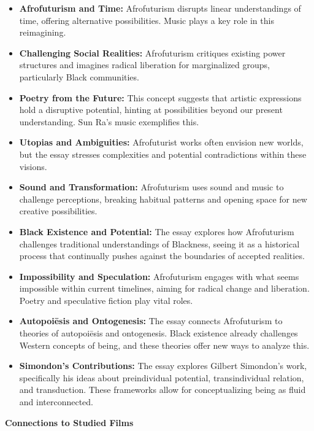 \documentclass[11pt,fleqn]{book} %
\begin{document}
\begin{itemize}
\item \textbf{Afrofuturism and Time:}  Afrofuturism disrupts linear understandings of time, offering alternative possibilities. Music plays a key role in this reimagining.

\item \textbf{Challenging Social Realities:} Afrofuturism critiques existing power structures and imagines radical liberation for marginalized groups, particularly Black communities.  

\item \textbf{Poetry from the Future:} This concept suggests that artistic expressions hold a disruptive potential, hinting at possibilities beyond our present understanding. Sun Ra's music exemplifies this.

\item \textbf{Utopias and Ambiguities:} Afrofuturist works often envision new worlds, but the essay stresses complexities and potential contradictions within these visions.

\item \textbf{Sound and Transformation:} Afrofuturism uses sound and music to challenge perceptions, breaking habitual patterns and opening space for new creative possibilities. 

\item \textbf{Black Existence and Potential:} The essay explores how Afrofuturism challenges traditional understandings of Blackness, seeing it as a historical process that continually pushes against the boundaries of accepted realities.

\item \textbf{Impossibility and Speculation:} Afrofuturism engages with what seems impossible within current timelines, aiming for radical change and liberation. Poetry and speculative fiction play vital roles.

\item \textbf{Autopoiēsis and Ontogenesis:} The essay connects Afrofuturism to theories of autopoiēsis and ontogenesis. Black existence already challenges Western concepts of being, and these theories offer new ways to analyze this.

\item \textbf{Simondon's Contributions:} The essay explores Gilbert Simondon's work, specifically his ideas about preindividual potential, transindividual relation, and transduction. These frameworks allow for conceptualizing being as fluid and interconnected. 
\end{itemize}
\vspace{5pt}
\textbf{Connections to Studied Films}
\end{document}
